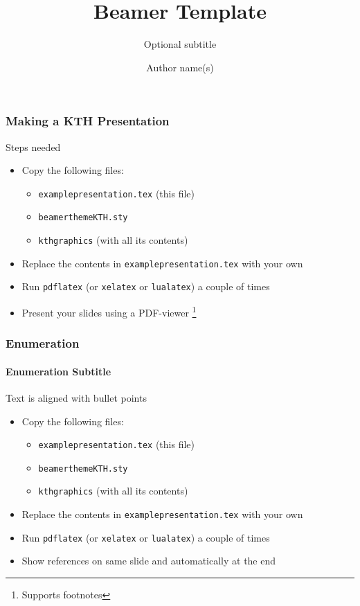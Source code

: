 \documentclass[aspectratio=169]{beamer}
\title{Beamer Template}
\subtitle{Optional subtitle}
\author[Short author]{Author name(s)}
\institute[Short Inst., Short Uni.]{Institute name, University name}
\begin{document}
\begin{frame}[plain] %
  \titlepage
\end{frame}

\begin{frame}
  \frametitle{Making a KTH Presentation}
  \begin{block}{Steps needed}
    \begin{itemize}
    \item Copy the following files:
    \begin{itemize}
    \item \texttt{examplepresentation.tex} (this file)
    \item \texttt{beamerthemeKTH.sty}
    \item \texttt{kthgraphics} (with all its contents)
    \end{itemize}
    \item Replace the contents in \texttt{examplepresentation.tex} with your own
    \item Run \texttt{pdflatex} (or \texttt{xelatex} or \texttt{lualatex}) a couple of times
    \item Present your slides using a PDF-viewer \footnote{Supports footnotes}
    \end{itemize}
  \end{block}
\end{frame}

\begin{frame}
  \frametitle{Enumeration}
  \framesubtitle{Enumeration Subtitle}
  Text is aligned with bullet points
  \begin{itemize}
    \item Copy the following files:
    \begin{itemize}
    \item \texttt{examplepresentation.tex} (this file) 
    \item \texttt{beamerthemeKTH.sty}
    \item \texttt{kthgraphics} (with all its contents)
    \end{itemize}
    \item Replace the contents in \texttt{examplepresentation.tex} with your own
    \item Run \texttt{pdflatex} (or \texttt{xelatex} or \texttt{lualatex}) a couple of times
    \item Show references on same slide  and automatically at the end
  \end{itemize}
\end{frame}
\end{document}
